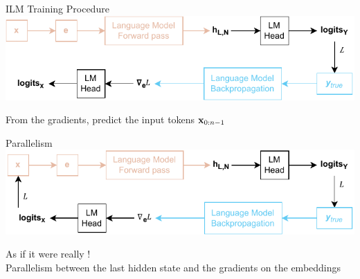 \begin{frame}[noframenumbering]{ILM Training Procedure}
    \includegraphics[width=\linewidth]{assets/grad_lm_head_parallelism_6.drawio.pdf}
    \vspace{1.5cm}
    
    \centering
    From the gradients, predict the input tokens $\mathbf{x}_{0:n-1}$
\end{frame}

\begin{frame}[noframenumbering]{Parallelism}
    \includegraphics[width=\linewidth]{assets/grad_lm_head_parallelism.drawio.pdf}
    \vspace{1.5cm}
    
    \centering
    As if it were really ! \\
    Parallelism between the last hidden state and the gradients on the embeddings
\end{frame}

